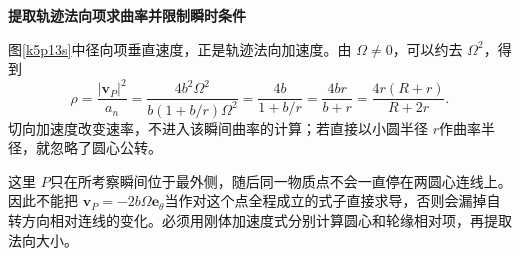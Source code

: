 \begin{solution}
\par\medskip{}\noindent\textbf{提取轨迹法向项求曲率并限制瞬时条件}\par\nobreak
图\ref{k5p13s}中径向项垂直速度，正是轨迹法向加速度。由 $\Omega\ne0$，可以约去 $\Omega^2$，得到
\[
 \rho=\frac{|\bm v_P|^2}{a_n}
 =\frac{4b^2\Omega^2}{b(1+b/r)\Omega^2}
 =\frac{4b}{1+b/r}
 =\boxed{\frac{4br}{b+r}=\frac{4r(R+r)}{R+2r}}.
\]
切向加速度改变速率，不进入该瞬间曲率的计算；若直接以小圆半径 $r$作曲率半径，就忽略了圆心公转。

这里 $P$只在所考察瞬间位于最外侧，随后同一物质点不会一直停在两圆心连线上。因此不能把 $\bm v_P=-2b\Omega\bm e_\theta$当作对这个点全程成立的式子直接求导，否则会漏掉自转方向相对连线的变化。必须用刚体加速度式分别计算圆心和轮缘相对项，再提取法向大小。\end{solution}

